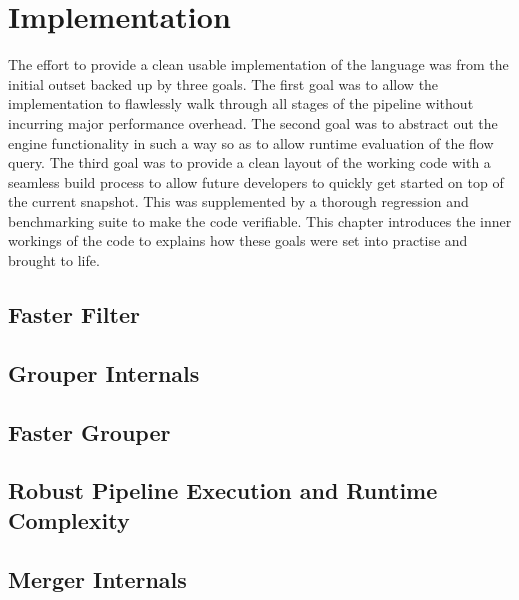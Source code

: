 \chapter{Implementation}\label{ch:implementation}

The effort to provide a clean usable implementation of the language was from
the initial outset backed up by three goals. The first goal was to allow the
implementation to flawlessly walk through all stages of the pipeline without
incurring major performance overhead. The second goal was to abstract out the
engine functionality in such a way so as to allow runtime evaluation of the
flow query. The third goal was to provide a clean layout of the working code
with a seamless build process to allow future developers to quickly get
started on top of the current snapshot. This was supplemented by a thorough
regression and benchmarking suite to make the code verifiable. This chapter
introduces the inner workings of the code to explains how these goals were set
into practise and brought to life.

\section{Faster Filter}\label{sec:faster-filter}

\section{Grouper Internals}\label{sec:grouper-internals}

\section{Faster Grouper}\label{sec:fv2-faster-grouper}

\section{Robust Pipeline Execution and Runtime Complexity}\label{sec:pipeline}

\section{Merger Internals}\label{sec:merger-internals}

